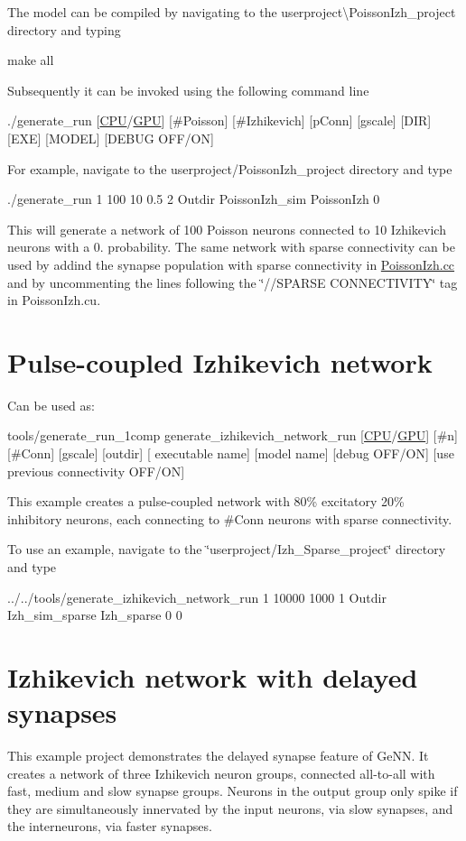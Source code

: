 The model can be compiled by navigating to the {\ttfamily userproject\textbackslash{}Poisson\+Izh\+\_\+project} directory and typing 
\begin{DoxyCode}
make all
\end{DoxyCode}
 Subsequently it can be invoked using the following command line 
\begin{DoxyCode}
./generate\_run [\hyperlink{modelSpec_8h_ad703205f9a4d4bb6af9c25257c23ce6d}{CPU}/\hyperlink{modelSpec_8h_a39cb9803524b6f3b783344b2f89867b4}{GPU}] [#Poisson] [#Izhikevich] [pConn] [gscale] [DIR] [EXE] [MODEL] [DEBUG OFF/ON]
\end{DoxyCode}
 For example, navigate to the {\ttfamily userproject/\+Poisson\+Izh\+\_\+project} directory and type 
\begin{DoxyCode}
./generate\_run 1 100 10 0.5 2 Outdir PoissonIzh\_sim PoissonIzh 0
\end{DoxyCode}
 This will generate a network of 100 Poisson neurons connected to 10 Izhikevich neurons with a 0. probability. The same network with sparse connectivity can be used by addind the synapse population with sparse connectivity in \hyperlink{PoissonIzh_8cc}{Poisson\+Izh.\+cc} and by uncommenting the lines following the \char`\"{}//\+S\+P\+A\+R\+S\+E C\+O\+N\+N\+E\+C\+T\+I\+V\+I\+T\+Y\char`\"{} tag in Poisson\+Izh.\+cu.\hypertarget{Examples_sec_ex_izhnetwork}{}\section{Pulse-\/coupled Izhikevich network}\label{Examples_sec_ex_izhnetwork}
Can be used as\+: 
\begin{DoxyCode}
tools/generate\_run\_1comp generate\_izhikevich\_network\_run [\hyperlink{modelSpec_8h_ad703205f9a4d4bb6af9c25257c23ce6d}{CPU}/\hyperlink{modelSpec_8h_a39cb9803524b6f3b783344b2f89867b4}{GPU}] [#n] [#Conn] [gscale] [outdir] [
      executable name] [model name] [debug OFF/ON] [use previous connectivity OFF/ON]
\end{DoxyCode}
 This example creates a pulse-\/coupled network \cite{izhikevich2003simple} with 80\% excitatory 20\% inhibitory neurons, each connecting to \#\+Conn neurons with sparse connectivity.

To use an example, navigate to the \char`\"{}userproject/\+Izh\+\_\+\+Sparse\+\_\+project\char`\"{} directory and type 
\begin{DoxyCode}
../../tools/generate\_izhikevich\_network\_run 1 10000 1000 1 Outdir Izh\_sim\_sparse Izh\_sparse 0 0
\end{DoxyCode}
\hypertarget{Examples_sec_ex_izhdelay}{}\section{Izhikevich network with delayed synapses}\label{Examples_sec_ex_izhdelay}
This example project demonstrates the delayed synapse feature of Ge\+N\+N. It creates a network of three Izhikevich neuron groups, connected all-\/to-\/all with fast, medium and slow synapse groups. Neurons in the output group only spike if they are simultaneously innervated by the input neurons, via slow synapses, and the interneurons, via faster synapses.

